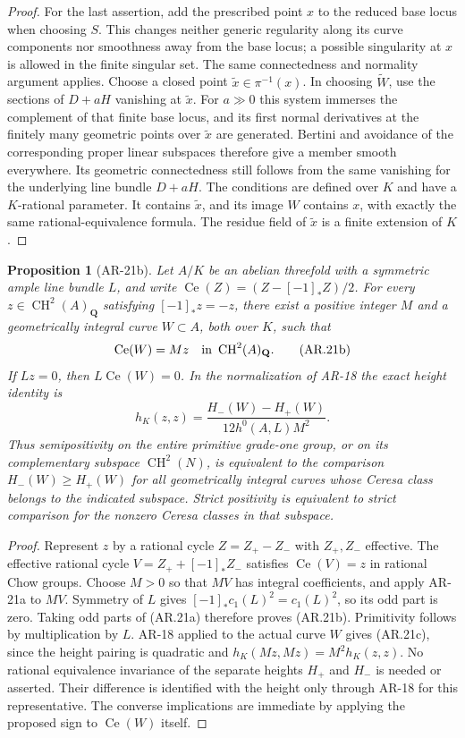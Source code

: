 \documentclass[11pt,a4paper]{article}
\newtheorem{proposition}[theorem]{Proposition}
\begin{document}
\begin{proof}
For the last assertion, add the prescribed point $x$ to the reduced
base locus when choosing $S$.  This changes neither generic
regularity along its curve components nor smoothness away from the
base locus; a possible singularity at $x$ is allowed in the finite
singular set.  The same connectedness and normality argument
applies.  Choose a closed point $\widetilde x\in\pi^{-1}(x)$.
In choosing $\widetilde W$, use the sections of $D+aH$ vanishing at
$\widetilde x$.  For $a\gg0$ this system immerses the complement
of that finite base locus, and its first normal derivatives at the
finitely many geometric points over $\widetilde x$ are generated.
Bertini and avoidance of the corresponding proper linear
subspaces therefore give a member smooth everywhere.  Its
geometric connectedness still follows from the same vanishing for
the underlying line bundle $D+aH$.  The conditions are defined over
$K$ and have a $K$-rational parameter.  It contains
$\widetilde x$, and its image $W$ contains $x$, with exactly the
same rational-equivalence formula.  The residue field of
$\widetilde x$ is a finite extension of $K$.
\end{proof}

\begin{proposition}[AR-21b]
Let $A/K$ be an abelian threefold with a symmetric ample line bundle
$L$, and write
$\operatorname{Ce}(Z)=(Z-[-1]_*Z)/2$.
For every $z\in\operatorname{CH}^2(A)_{\mathbf Q}$ satisfying
$[-1]_*z=-z$, there exist a positive integer $M$ and a geometrically
integral curve $W\subset A$, both over $K$, such that
\[
 \operatorname{Ce}(W)=Mz
 \quad\hbox{in }\operatorname{CH}^2(A)_{\mathbf Q}.
 \tag{AR.21b}
\]
If $Lz=0$, then $L\operatorname{Ce}(W)=0$.  In the normalization of
AR-18 the exact height identity is
\[
 h_K(z,z)=\frac{H_-(W)-H_+(W)}{12h^0(A,L)M^2}.
 \tag{AR.21c}
\]
Thus semipositivity on the entire primitive grade-one group, or on its
complementary subspace $\operatorname{CH}^2(N)$, is equivalent to the
comparison $H_-(W)\ge H_+(W)$ for all geometrically integral curves
whose Ceresa class belongs to the indicated subspace.  Strict
positivity is equivalent to strict comparison for the nonzero Ceresa
classes in that subspace.
\end{proposition}

\begin{proof}
Represent $z$ by a rational cycle $Z=Z_+-Z_-$ with $Z_+,Z_-$ effective.
The effective rational cycle $V=Z_++[-1]_*Z_-$ satisfies
$\operatorname{Ce}(V)=z$ in rational Chow groups.  Choose $M>0$ so
that $MV$ has integral coefficients, and apply AR-21a to $MV$.
Symmetry of $L$ gives $[-1]_*c_1(L)^2=c_1(L)^2$, so its odd part is
zero.  Taking odd parts of (AR.21a) therefore proves (AR.21b).
Primitivity follows by multiplication by $L$.  AR-18 applied to the
actual curve $W$ gives (AR.21c), since the height pairing is quadratic
and $h_K(Mz,Mz)=M^2h_K(z,z)$.  No rational equivalence invariance of
the separate heights $H_+$ and $H_-$ is needed or asserted.  Their
difference is identified with the height only through AR-18 for this
representative.  The converse implications are immediate by applying
the proposed sign to $\operatorname{Ce}(W)$ itself.
\end{proof}
\end{document}
